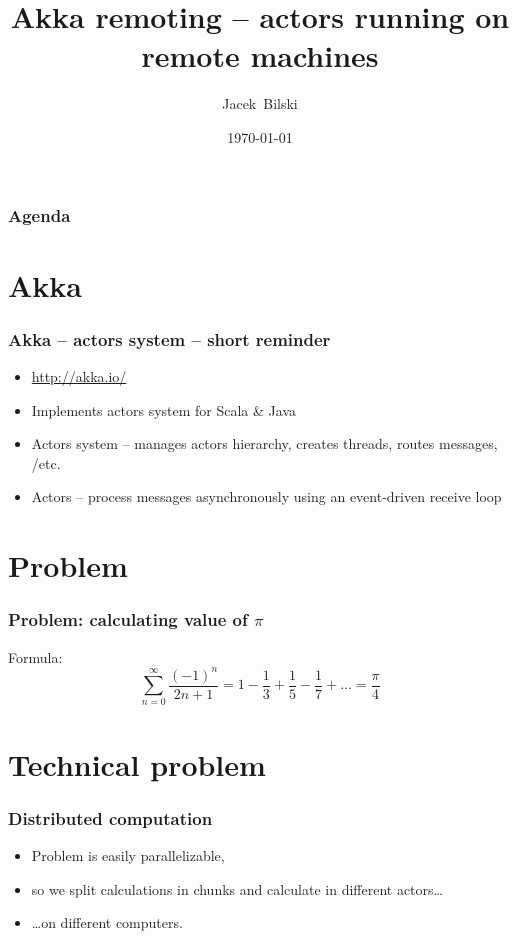 \documentclass[xcolor=dvipsnames]{beamer}
\title{Akka remoting -- actors running on remote machines}
\author{Jacek~Bilski}
\date{\today}
\begin{document}
\begin{frame}
\titlepage
\end{frame}

\begin{frame}
\frametitle{Agenda}
\tableofcontents[pausesections]
\end{frame}

\section{Akka}

\begin{frame}
\frametitle{Akka -- actors system -- short reminder}
\begin{itemize}
\item \href{http://akka.io/}{http://akka.io/}
\item Implements actors system for Scala \& Java
\item Actors system -- manages actors hierarchy, creates threads, routes messages, /etc.
\item Actors -- process messages asynchronously using an event-driven receive loop
\end{itemize}
\end{frame}

\section{Problem}

\begin{frame}
\frametitle{Problem: calculating value of $\pi$}
Formula:
\[\sum_{n=0}^\infty \frac{(-1)^n}{2n+1} = 1 - \frac{1}{3} + \frac{1}{5} - \frac{1}{7} + \ldots = \frac{\pi}{4}\]
\end{frame}

\section{Technical problem}

\begin{frame}
\frametitle{Distributed computation}
\begin{itemize}
\item Problem is easily parallelizable,
\item so we split calculations in chunks and calculate in different actors\ldots
\item \ldots{}on different computers.
\end{itemize}
\end{frame}
\end{document}
